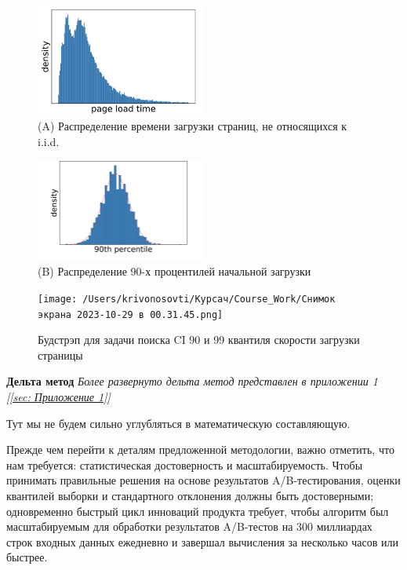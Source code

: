 \documentclass[specialist,
               substylefile = spbu_report.rtx,
               subf,href,colorlinks=true, 12pt]{disser}
\begin{document}
    
        \begin{figure}[h]
            \centering
            \includegraphics[width=0.5\textwidth]{Снимок экрана 2023-10-26 в 19.21.39.png}
            \caption{(A) Распределение времени загрузки страниц, не относящихся к i.i.d.}
        \end{figure}
        
        \begin{figure}[h]
            \centering
            \includegraphics[width=0.5\textwidth]{Снимок экрана 2023-10-26 в 19.21.35.png}
            \caption{(B) Распределение 90-х процентилей начальной загрузки}
        \end{figure}


            
        \begin{figure}[h]
            \centering
            \texttt{[image: /Users/krivonosovti/Курсач/Course\_Work/Снимок экрана 2023-10-29 в 00.31.45.png]}
            \caption{Будстрэп для задачи поиска CI 90 и 99 квантиля скорости загрузки страницы}
        \end{figure}
        

        \textbf{Дельта метод}
        \textit{Более развернуто дельта метод представлен в приложении 1 [\ref{sec: Приложение 1}]} 
        
        Тут мы не будем сильно углубляться в математическую составляющую. 
        
        Прежде чем перейти к деталям предложенной методологии, важно отметить, что нам требуется: статистическая 
        достоверность и масштабируемость. Чтобы принимать правильные решения на основе результатов A/B-тестирования, 
        оценки квантилей выборки и стандартного отклонения должны быть достоверными; одновременно быстрый цикл инноваций 
        продукта требует, чтобы алгоритм был масштабируемым для обработки результатов A/B-тестов на 300 миллиардах строк 
        входных данных ежедневно и завершал вычисления за несколько часов или быстрее.
\end{document}
